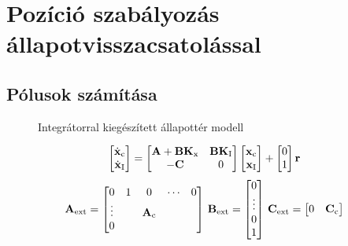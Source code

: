 \section{Pozíció szabályozás állapotvisszacsatolással}

\subsection{Pólusok számítása}

\begin{figure}[H]
    \centering
	\caption{Integrátorral kiegészített állapottér modell}
	\label{fig:6a_allapotter_hatasvazlat_jav}
\end{figure}

\begin{equation}
	\mat{\dot{\B{x}}_\text{c}\\\dot{\B{x}}_\text{I}} =
		\mat{\B{A}+\B{B}\B{K}_\text{x}&\B{B}\B{K}_\text{I}\\-\B{C}&0}\mat{\B{x}_\text{c}\\\B{x}_\text{I}}+\mat{0\\1}\B{r}\\
\end{equation}
\begin{equation}
	\B{A}_\text{ext} = \mat{0&1&0&\cdots&0\\\vdots&&\B{A}_\text{c}\\0}\,
	\B{B}_\text{ext} = \mat{0\\\vdots\\0\\1}\,
	\B{C}_\text{ext} = \mat{0&\B{C}_\text{c}}
\end{equation}

  
